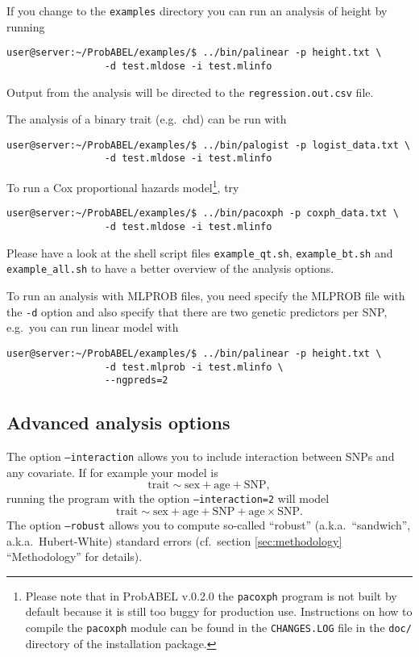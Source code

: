 \documentclass[12pt,a4paper]{article}
\begin{document}
If you change to the \texttt{examples} directory you can run
an analysis of height by running
\begin{verbatim}
user@server:~/ProbABEL/examples/$ ../bin/palinear -p height.txt \
				 -d test.mldose -i test.mlinfo
\end{verbatim}
Output from the analysis will be directed to the
\texttt{regression.out.csv} file.

The analysis of a binary trait (e.g.~chd) can be run with
\begin{verbatim}
user@server:~/ProbABEL/examples/$ ../bin/palogist -p logist_data.txt \
				 -d test.mldose -i test.mlinfo
\end{verbatim}

To run a Cox proportional hazards model\footnote{Please note that in
  ProbABEL v.0.2.0 the \texttt{pacoxph} program is not built by
  default because it is still too buggy for production
  use. Instructions on how to compile the \texttt{pacoxph} module can
  be found in the \texttt{CHANGES.LOG} file in the \texttt{doc/}
  directory of the installation package.}, try
\begin{verbatim}
user@server:~/ProbABEL/examples/$ ../bin/pacoxph -p coxph_data.txt \
				 -d test.mldose -i test.mlinfo
\end{verbatim}

Please have a look at the shell script files \texttt{example\_qt.sh},
\texttt{example\_bt.sh} and \texttt{example\_all.sh} to have
a better overview of the analysis options.

To run an analysis with MLPROB files, you need specify the MLPROB file
with the \texttt{-d} option and also specify that there are two
genetic predictors per SNP, e.g.~you can run linear model with
\begin{verbatim}
user@server:~/ProbABEL/examples/$ ../bin/palinear -p height.txt \
				 -d test.mlprob -i test.mlinfo \
				 --ngpreds=2
\end{verbatim}

\subsection{Advanced analysis options}
The option \texttt{--interaction} allows you to include interaction
between SNPs and any covariate. If for example your model is
\begin{equation*}
  \textrm{trait} \sim \textrm{sex} + \textrm{age} + \textrm{SNP},
\end{equation*}
running the program with the option \texttt{--interaction=2} will model
\begin{equation*}
  \textrm{trait} \sim \textrm{sex} + \textrm{age} + \textrm{SNP} +
  \textrm{age} \times \mathrm{SNP}.
\end{equation*}
The option \texttt{--robust} allows you to compute so-called
``robust'' (a.k.a.~``sandwich'', a.k.a.~Hubert-White) standard errors
(cf.~section \ref{sec:methodology} ``Methodology'' for details).
\end{document}
